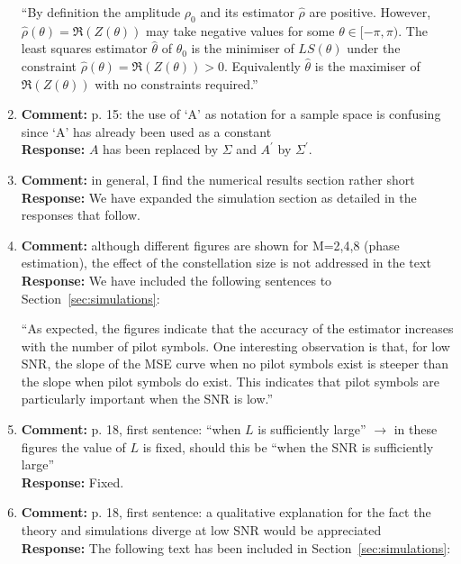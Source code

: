 \documentclass{article}
\begin{document}
\begin{enumerate}
``By definition the amplitude $\rho_0$ and its estimator $\hat{\rho}$ are positive.  However, $\hat{\rho}(\theta) = \Re(Z(\theta))$ may take negative values for some $\theta \in [-\pi,\pi)$.  The least squares estimator $\hat{\theta}$ of $\theta_0$ is the minimiser of $LS(\theta)$ under the constraint $\hat{\rho}(\theta) = \Re(Z(\theta)) > 0$.  Equivalently $\hat{\theta}$ is the maximiser of $\Re(Z(\theta))$ with no constraints required.''

\item \textbf{Comment:} p. 15: the use of `A' as notation for a sample space is confusing since `A' has already been used as a constant \\
\textbf{Response:} $A$ has been replaced by $\Sigma$ and $A^\prime$ by $\Sigma^\prime$.

\item \textbf{Comment:} in general, I find the numerical results section rather short \\
\textbf{Response:} We have expanded the simulation section as detailed in the responses that follow.

\item \textbf{Comment:} although different figures are shown for M=2,4,8 (phase estimation), the effect of the constellation size is not addressed in the text  \\
\textbf{Response:}  We have included the following sentences to Section~\ref{sec:simulations}:

``As expected, the figures indicate that the accuracy of the estimator increases with the number of pilot symbols.  One interesting observation is that, for low SNR, the slope of the MSE curve when no pilot symbols exist is steeper than the slope when pilot symbols do exist.  This indicates that pilot symbols are particularly important when the SNR is low.''

\item \textbf{Comment:} p. 18, first sentence: ``when $L$ is sufficiently large'' $\to$ in these figures the value of $L$ is fixed, should this be ``when the SNR is sufficiently large''  \\
\textbf{Response:} Fixed.

\item \textbf{Comment:} p. 18, first sentence: a qualitative explanation for the fact the theory and simulations diverge at low SNR would be appreciated  \\
\textbf{Response:} The following text has been included in Section~\ref{sec:simulations}:


\end{enumerate}
\end{document}
